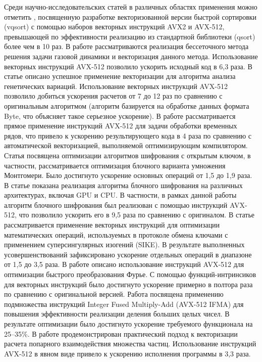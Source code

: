 Среди научно-исследовательских статей в различных областях применения можно отметить \cite{Blacher2022VecQuick}, посвященную разработке векторизованной версии быстрой сортировки (vqsort) с помощью наборов векторных инструкций AVX2 и AVX-512, превышающей по эффективности реализацию из стандартной библиотеки (qsort) более чем в 10 раз.
В работе \cite{Long2022VecSPD} рассматриваются реализация бессеточного метода решения задачи газовой динамики и векторизация данного метода. 
Использование векторных инструкций AVX-512 позволило ускорить исходный код в 6,3 раза.
В статье \cite{PonteFernandez2022VecInteractions} описано успешное применение векторизации для алгоритма анализа генетических вариаций.
Использование векторных инструкций AVX-512 позволило добиться ускорения расчетов от 7 до 12 раз по сравнению с оригинальным алгоритмом (алгоритм базируется на обработке данных формата Byte, что объясняет такое серьезное ускорение).
В работе \cite{Quisland2023VecSeries} рассматривается прямое применение инструкций AVX-512 для задачи обработки временных рядов, что привело к ускорению результирующего кода в 4 раза по сравнению с автоматической векторизацией, выполняемой оптимизирующим компилятором. 
Статья \cite{Buhrow2022VecMult} посвящена оптимизации алгоритмов шифрования с открытым ключом, в частности, рассматривается оптимизация блочного варианта умножения Монтгомери.
Было достигнуто ускорение основных операций от 1,5 до 1,9 раза.
В статье \cite{Choi2022VecPIPO} показана реализация алгоритма блочного шифрования на различных архитектурах, включая GPU\label{abbr:gpu} и CPU\label{abbr:cpu}.
В частности, в рамках данной работы алгоритм блочного шифрования был реализован с помощью инструкций AVX-512, что позволило ускорить его в 9,5 раза по сравнению с оригиналом.
В статье \cite{Cheng2022VecSIKE} рассматривается применение векторных инструкций для оптимизации математических операций, используемых в протоколе обмена ключами с применением суперсингулярных изогений (SIKE)\label{abbr:sike}.
В результате выполненных усовершенствований зафиксировано ускорение отдельных операций в диапазоне от 1,5 до 3,5 раза.
В работе \cite{Sansone2023VecFourier} описано использование инструкций AVX-512 для оптимизации быстрого преобразования Фурье.\label{term:furier_transform}
С помощью функций-интринсиков для векторных инструкций было достигнуто ускорение примерно в полтора раза по сравнению с оригинальной версией.
Работа \cite{Edamatsu2023VecDiv} посвящена применению подмножества инструкций Integer Fused Multiply-Add (AVX-512 IFMA)\label{abbr:ifma} для повышения эффективности реализации деления больших целых чисел.
В результате оптимизации было достигнуто ускорение требуемого функционала на 25–35\%.
В работе \cite{Medakin2021VecPP} продемонстрирован практический подход к векторизации расчета попарного взаимодействия множества частиц.
Использование инструкций AVX-512 в явном виде привело к ускорению исполнения программы в 3,3 раза.

